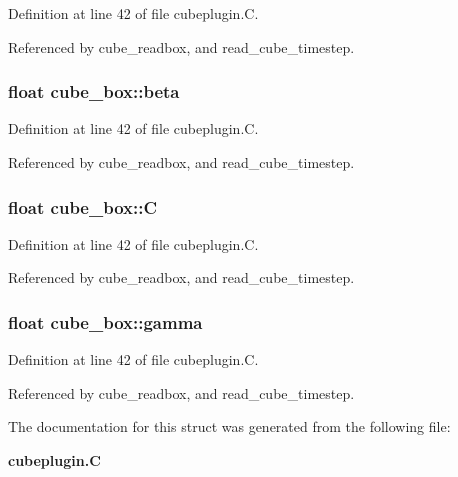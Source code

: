Definition at line 42 of file cubeplugin.C.

Referenced by cube\_\-readbox, and read\_\-cube\_\-timestep.
\subsubsection{\setlength{\rightskip}{0pt plus 5cm}float cube\_\-box::beta}\label{structcube__box_m4}




Definition at line 42 of file cubeplugin.C.

Referenced by cube\_\-readbox, and read\_\-cube\_\-timestep.
\subsubsection{\setlength{\rightskip}{0pt plus 5cm}float cube\_\-box::C}\label{structcube__box_m2}




Definition at line 42 of file cubeplugin.C.

Referenced by cube\_\-readbox, and read\_\-cube\_\-timestep.
\subsubsection{\setlength{\rightskip}{0pt plus 5cm}float cube\_\-box::gamma}\label{structcube__box_m5}




Definition at line 42 of file cubeplugin.C.

Referenced by cube\_\-readbox, and read\_\-cube\_\-timestep.

The documentation for this struct was generated from the following file:\begin{CompactItemize}
\item 
{\bf cubeplugin.C}\end{CompactItemize}
